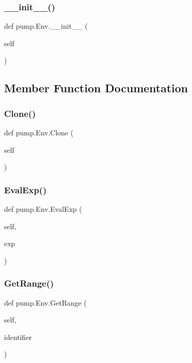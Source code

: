 \subsubsection{\texorpdfstring{\+\_\+\+\_\+init\+\_\+\+\_\+()}{\_\_init\_\_()}}
{\footnotesize\ttfamily def pump.\+Env.\+\_\+\+\_\+init\+\_\+\+\_\+ (\begin{DoxyParamCaption}\item[{}]{self }\end{DoxyParamCaption})}



\subsection{Member Function Documentation}
\mbox{\label{classpump_1_1_env_a4c1b156cfa4aec708746bbe07dae5f1a}} 
\subsubsection{\texorpdfstring{Clone()}{Clone()}}
{\footnotesize\ttfamily def pump.\+Env.\+Clone (\begin{DoxyParamCaption}\item[{}]{self }\end{DoxyParamCaption})}

\mbox{\label{classpump_1_1_env_a29fa1ceb1f7c22e8e982133f4808317f}} 
\subsubsection{\texorpdfstring{Eval\+Exp()}{EvalExp()}}
{\footnotesize\ttfamily def pump.\+Env.\+Eval\+Exp (\begin{DoxyParamCaption}\item[{}]{self,  }\item[{}]{exp }\end{DoxyParamCaption})}

\mbox{\label{classpump_1_1_env_a1df05a550bdcfe4bb8c5b1608484a6dc}} 
\subsubsection{\texorpdfstring{Get\+Range()}{GetRange()}}
{\footnotesize\ttfamily def pump.\+Env.\+Get\+Range (\begin{DoxyParamCaption}\item[{}]{self,  }\item[{}]{identifier }\end{DoxyParamCaption})}

